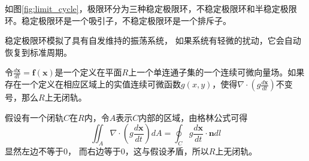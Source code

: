 如图\ref{fig:limit_cycle}，极限环分为三种稳定极限环，不稳定极限环和半稳定极限环。稳定极限环是一个吸引子，不稳定极限环是一个排斥子。

稳定极限环模拟了具有自发维持的振荡系统， 如果系统有轻微的扰动，它会自动恢复到标准周期。

\begin{thm}[Dulac准则]
    令$\frac{d\mathbf{x}}{dt}=\mathbf{f}(\mathbf{x})$是一个定义在平面$R$上一个单连通子集的一个连续可微向量场。如果存在一个定义在相应区域上的实值连续可微函数$g(x, y)$，使得$\nabla \cdot (g \frac{d\mathbf{x}}{dt})$不变号，那么$R$上无闭轨。
\end{thm}
\begin{pf}
    假设有一个闭轨$C$在$R$内，令$A$表示$C$内部的区域，由格林公式可得
    \begin{equation}
        \iint_A \nabla \cdot(g \frac{d\mathbf{x}}{dt})dA=\oint_C g \frac{d\mathbf{x}}{dt}\cdot \mathbf{n}dl
    \end{equation}
    显然左边不等于0， 而右边等于0，这与假设矛盾，所以$R$上无闭轨。
\end{pf}

